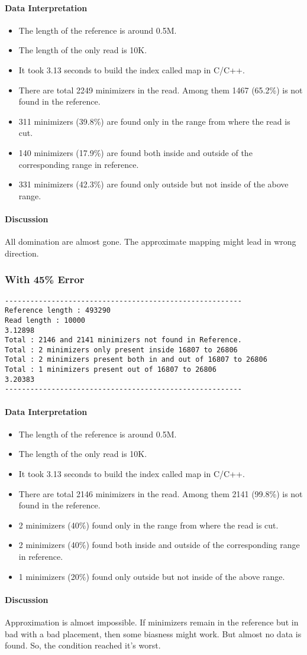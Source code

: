 \documentclass{standalone}
\begin{document}
\paragraph*{Data Interpretation}
\begin{itemize}
	\item The length of the reference is around 0.5M.
	\item The length of the only read is 10K.
	\item It took 3.13 seconds to build the index called map in C/C++.
	\item There are total 2249 minimizers in the read. Among them 1467 (65.2\%) is not found in the reference.
	\item 311 minimizers (39.8\%) are found only in the range from where the read is cut.
	\item 140 minimizers (17.9\%) are found both inside and outside of the corresponding range in reference.
	\item 331 minimizers (42.3\%) are found only outside but not inside of the above range.
\end{itemize}
\paragraph*{Discussion}
All domination are almost gone. The approximate mapping might lead in wrong direction.
\subsubsection*{With 45\% Error}
\begin{verbatim}
--------------------------------------------------------
Reference length : 493290
Read length : 10000
3.12898
Total : 2146 and 2141 minimizers not found in Reference.
Total : 2 minimizers only present inside 16807 to 26806
Total : 2 minimizers present both in and out of 16807 to 26806
Total : 1 minimizers present out of 16807 to 26806
3.20383
--------------------------------------------------------
\end{verbatim}
\paragraph*{Data Interpretation}
\begin{itemize}
	\item The length of the reference is around 0.5M.
	\item The length of the only read is 10K.
	\item It took 3.13 seconds to build the index called map in C/C++.
	\item There are total 2146 minimizers in the read. Among them 2141 (99.8\%) is not found in the reference.
	\item 2 minimizers (40\%) found only in the range from where the read is cut.
	\item 2 minimizers (40\%) found both inside and outside of the corresponding range in reference.
	\item 1 minimizers (20\%) found only outside but not inside of the above range.
\end{itemize}
\paragraph*{Discussion}
Approximation is almost impossible. If minimizers remain in the reference but in bad with a bad placement, then some biasness might work. But almost no data is found. So, the condition reached it's worst.
\end{document}

